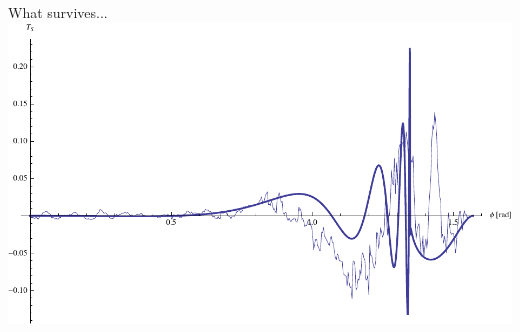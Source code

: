 \documentclass{beamer}
\begin{document}
\begin{frame}{What survives...}
    \includegraphics[width=\textwidth]{comparison-over-phi.pdf}
\end{frame}
\end{document}
